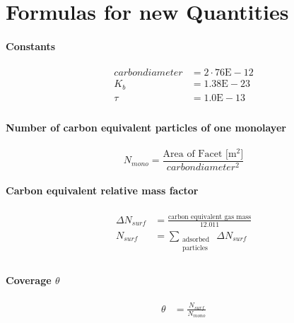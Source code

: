 
\chapter{Formulas for new Quantities}\label{chapter:Formulas}

\subsubsection*{Constants}
\begin{equation}
	\begin{split}
	carbondiameter&=2 \cdot 76\text{E}-12\\
	K_b&=1.38\text{E}-23\\
	\tau&=1.0\text{E}-13\\
	\end{split}
\end{equation}

\subsubsection*{Number of carbon equivalent particles of one monolayer}
\begin{equation}
	N_{mono}=\frac{\text{Area of Facet [m$^2$]}}{carbondiameter^2}
\end{equation}

\subsubsection*{Carbon equivalent relative mass factor}
\begin{equation}
	\begin{split}
	\Delta N_{surf}&=\frac{\text{carbon equivalent gas mass}}{12.011}\\
	N_{surf}&=\sum\limits_{\substack{\text{adsorbed}\\\text{particles}}}\ \Delta N_{surf}\\
	\end{split}
\end{equation}

\subsubsection*{Coverage $\theta$}
\begin{equation}
	\begin{split}
		\theta&=\frac{N_{surf}}{N_{mono}}
	\end{split}
\end{equation}


